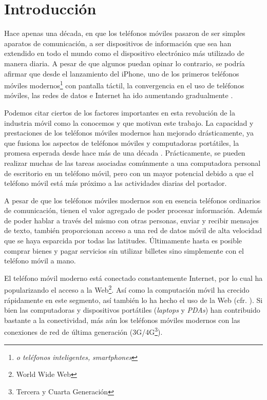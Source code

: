 
\chapter{Introducción\label{introduccion}}

Hace apenas una década, en que los teléfonos móviles pasaron de ser
simples aparatos de comunicación, a ser dispositivos de información
que sea han extendido en todo el mundo como el dispositivo electrónico
más utilizado de manera diaria. A pesar de que algunos puedan opinar
lo contrario, se podría afirmar que desde el lanzamiento del iPhone,
uno de los primeros teléfonos móviles modernos\footnote{ \textit{\emph{o teléfonos inteligentes, }}\textit{smartphones}}
con pantalla táctil, la convergencia en el uso de teléfonos móviles,
las redes de datos e Internet ha ido aumentando gradualmente \cite{fling2009mobile}.

Podemos citar ciertos de los factores importantes en esta revolución
de la industria móvil como la conocemos y que motivan este trabajo.
La capacidad y prestaciones de los teléfonos móviles modernos han
mejorado drásticamente, ya que fusiona los aspectos de teléfonos móviles
y computadoras portátiles, la promesa esperada desde hace más de una
década \cite{Tanenbaum2010}. Prácticamente, se pueden realizar muchas
de las tareas asociadas comúnmente a una computadora personal de escritorio
en un teléfono móvil, pero con un mayor potencial debido a que el
teléfono móvil está más próximo a las actividades diarias del portador.

A pesar de que los teléfonos móviles modernos son en esencia teléfonos
ordinarios de comunicación, tienen el valor agregado de poder procesar
información. Además de poder hablar a través del mismo con otras personas,
enviar y recibir mensajes de texto, también proporcionan acceso a
una red de datos móvil de alta velocidad que se haya esparcida por
todas las latitudes. Últimamente hasta es posible comprar bienes y
pagar servicios sin utilizar billetes sino simplemente con el teléfono
móvil a mano. 

El teléfono móvil moderno está conectado constantemente Internet,
por lo cual ha popularizando el acceso a la Web\footnote{World Wide Web}.
Así como la computación móvil ha crecido rápidamente en este segmento,
así también lo ha hecho el uso de la Web (cfr. \cite{nyt2008iph}).
Si bien las computadoras y dispositivos portátiles (\emph{laptops}
y \emph{PDAs}) han contribuido bastante a la conectividad, más aún
los teléfonos móviles modernos con las conexiones de red de última
generación (3G/4G\footnote{Tercera y Cuarta Generación}).


